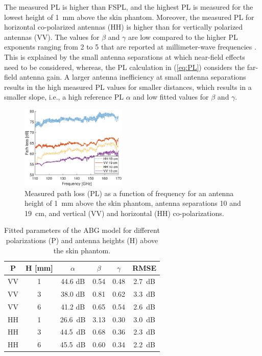 \documentclass[preprint]{rsl}
\begin{document}
The measured PL is higher than FSPL, and the highest PL is measured for the lowest height of 1~mm above the skin phantom.
Moreover, the measured PL for horizontal co-polarized antennas (HH) is higher than for vertically polarized antennas (VV).
The values for $\beta$ and $\gamma$ are low compared to the higher PL exponents ranging from 2 to 5 that are reported at millimeter-wave frequencies \cite{Petrillo2014, Aminzadeh2021_tap}. 
This is explained by the small antenna separations at which near-field effects need to be considered, whereas, the PL calculation in (\ref{eq:PL}) considers the far-field antenna gain.
A larger antenna inefficiency at small antenna separations results in the high measured PL values for smaller distances, which results in a smaller slope, i.e., a high reference PL $\alpha$ and low fitted values for $\beta$ and $\gamma$.

\begin{figure}[t]
\begin{center}
  \includegraphics[width=0.45\textwidth]{figures/PL_vs_freq}
\caption{Measured path loss (PL) as a function of frequency for an antenna height of 1~mm above the skin phantom, antenna separations 10 and 19~cm, and vertical (VV) and horizontal (HH) co-polarizations.}
\label{fig:PL_vs_freq}
\end{center}
\end{figure}
\begin{table}[t]
  \caption{Fitted parameters of the ABG model for different polarizations (P) and antenna heights (H) above the skin phantom.}
  \label{table:ABG}
  \begin{center}
    \begin{tabular}{cc|cccc}
      P & H [mm] & $\alpha$ & $\beta$ & $\gamma$ & RMSE \\
      \hline
      VV & 1 & 44.6 dB & 0.54 & 0.48 & 2.7~dB \\
      VV & 3 & 38.0 dB & 0.81 & 0.62 & 3.3~dB \\
      VV & 6 & 41.2 dB & 0.65 & 0.54 & 2.6~dB \\
      HH & 1 & 26.6~dB & 3.13 & 0.30 & 3.0~dB \\
      HH & 3 & 44.5~dB & 0.68 & 0.36 & 2.3~dB \\
      HH & 6 & 45.5~dB & 0.60 & 0.34 & 2.2~dB \\
    \end{tabular}
  \end{center}
\end{table}
\end{document}
